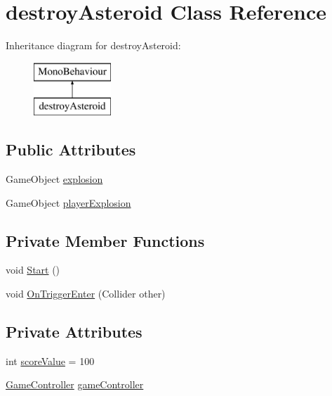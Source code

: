 \hypertarget{classdestroy_asteroid}{}\section{destroy\+Asteroid Class Reference}
\label{classdestroy_asteroid}
Inheritance diagram for destroy\+Asteroid\+:\begin{figure}[H]
\begin{center}
\leavevmode
\includegraphics[height=2.000000cm]{classdestroy_asteroid}
\end{center}
\end{figure}
\subsection*{Public Attributes}
\begin{DoxyCompactItemize}
\item 
Game\+Object \mbox{\hyperlink{classdestroy_asteroid_a2018ced0016af9930b084fcd0925bf09}{explosion}}
\item 
Game\+Object \mbox{\hyperlink{classdestroy_asteroid_a965a9ae3de825dbd7aa7e1d178713305}{player\+Explosion}}
\end{DoxyCompactItemize}
\subsection*{Private Member Functions}
\begin{DoxyCompactItemize}
\item 
void \mbox{\hyperlink{classdestroy_asteroid_acb3ec8a3aa718e82ea7af340e7a4b1c4}{Start}} ()
\item 
void \mbox{\hyperlink{classdestroy_asteroid_ae4487b546e704cf723006a2acf5915a0}{On\+Trigger\+Enter}} (Collider other)
\end{DoxyCompactItemize}
\subsection*{Private Attributes}
\begin{DoxyCompactItemize}
\item 
int \mbox{\hyperlink{classdestroy_asteroid_ab3249e724efaf100a9ae754787ef0e6d}{score\+Value}} = 100
\item 
\mbox{\hyperlink{class_game_controller}{Game\+Controller}} \mbox{\hyperlink{classdestroy_asteroid_aefc18b1603f8dd4e4ece9dc65ec46a48}{game\+Controller}}
\end{DoxyCompactItemize}


